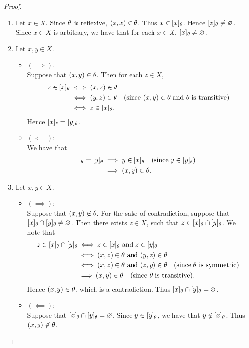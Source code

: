 \documentclass{book}
\begin{document}
	\begin{proof}\
		\begin{enumerate}
			\item Let $x \in X$. Since $\theta$ is reflexive, $(x,x) \in \theta$. Thus $x \in [x]_{\theta}$. Hence $[x]_{\theta} \neq \varnothing$. Since $x \in X$ is arbitrary, we have that for each $x \in X$, $[x]_{\theta} \neq \varnothing$.
			\item Let $x,y \in X$.
			\begin{itemize}
				\item $(\implies)$: \\
				Suppose that $(x,y) \in \theta$. Then for each $z \in X$, 
				\begin{align*}
					z \in [x]_{\theta}
					& \iff (x,z) \in \theta \\
					& \iff (y,z) \in \theta \quad \text{(since $(x,y) \in \theta$ and $\theta$ is transitive)} \\
					& \iff z \in [x]_{\theta}.
				\end{align*}
				Hence $[x]_{\theta}  = [y]_{\theta}$. 
				\item $(\impliedby)$: \\
				We have that 
				\begin{align*}
					[x]_{\th} = [y]_{\th}
					& \implies y \in [x]_{\th} \quad \text{(since $y \in [y]_{\th}$)} \\
					& \implies (x,y) \in \th. 
				\end{align*} 
			\end{itemize} 
			\item Let $x,y \in X$.
			\begin{itemize}
				\item $(\implies)$: \\
				Suppose that $(x,y) \not \in \theta$. For the sake of contradiction, suppose that $[x]_{\theta} \cap [y]_{\theta} \neq \varnothing$. Then there exists $z \in X$, such that $z \in [x]_{\theta} \cap [y]_{\theta}$. We note that
				\begin{align*}
					z \in [x]_{\theta} \cap [y]_{\theta}
					& \iff \text{$z \in [x]_{\theta}$ and $z \in [y]_{\theta}$} \\
					& \iff \text{$(x,z) \in \theta$ and $(y,z) \in \theta$} \\
					& \iff \text{$(x,z) \in \theta$ and $(z,y) \in \theta$} \quad \text{(since $\theta$ is symmetric)} \\
					& \implies (x,y) \in \theta \quad \text{(since $\theta$ is transitive)}.
				\end{align*}
				Hence $(x,y) \in \theta$, which is a contradiction. Thus $[x]_{\theta} \cap [y]_{\theta} = \varnothing$.
				\item $(\impliedby)$: \\
				Suppose that $[x]_{\theta} \cap [y]_{\theta} = \varnothing$. Since $y \in [y]_{\theta}$, we have that $y \not \in [x]_{\theta}$. Thus $(x,y) \not \in \theta$. 
			\end{itemize} 
		\end{enumerate}
	\end{proof}
	
\end{document}
